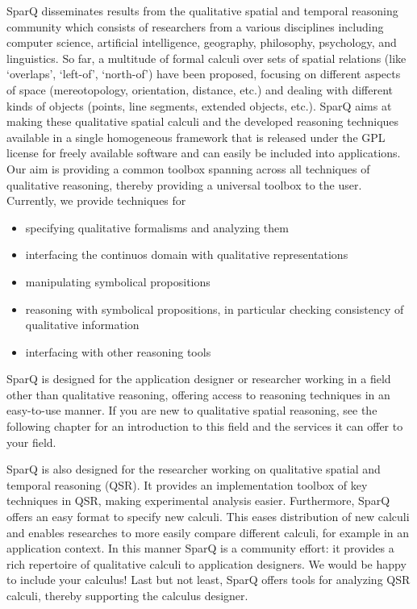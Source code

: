 \documentclass[headsepline]{scrreprt}
\theoremstyle{definition}
\newcommand{\engine}{SparQ}
\begin{document}
\engine{} disseminates results from the qualitative spatial and temporal reasoning community which consists of researchers from a various disciplines
including computer science, artificial intelligence, geography, philosophy,
psychology, and linguistics.
So far, a multitude of formal calculi over sets of
spatial relations (like `overlaps', `left-of',
`north-of') have been proposed, focusing on different
aspects of space (mereotopology, orientation, distance, etc.) and
dealing with different kinds of objects (points, line segments,
extended objects, etc.). \engine{} aims at making these qualitative spatial
calculi and the developed reasoning techniques available in a single
homogeneous framework that is released under the GPL license for freely available software and can easily be included into applications.
Our aim is providing a common toolbox spanning across all techniques of qualitative reasoning, thereby providing a universal toolbox to the user. Currently, we provide techniques for
\begin{itemize}
	\item specifying qualitative formalisms and analyzing them
	\item interfacing the continuos domain with qualitative representations
	\item manipulating symbolical propositions
	\item reasoning with symbolical propositions, in particular checking consistency of qualitative information
	\item interfacing with other reasoning tools
\end{itemize}

\engine{} is designed for the application designer or researcher working in a field other than qualitative reasoning, offering access to reasoning techniques in an easy-to-use manner. If you  are new to qualitative spatial reasoning, see the following chapter for an introduction to this field and the services it can offer to your field.

SparQ is also designed for the researcher working on qualitative spatial and temporal reasoning (QSR). It provides an implementation toolbox of key techniques in QSR, making experimental analysis easier. Furthermore, SparQ offers an easy format to specify new calculi. This eases distribution of new calculi and enables researches to more easily compare different calculi, for example in an application context. In this manner SparQ is a community effort: it provides a rich repertoire of qualitative calculi to application designers. We would be happy to include your calculus! Last but not least, SparQ offers tools for analyzing QSR calculi, thereby supporting the calculus designer.
\end{document}
